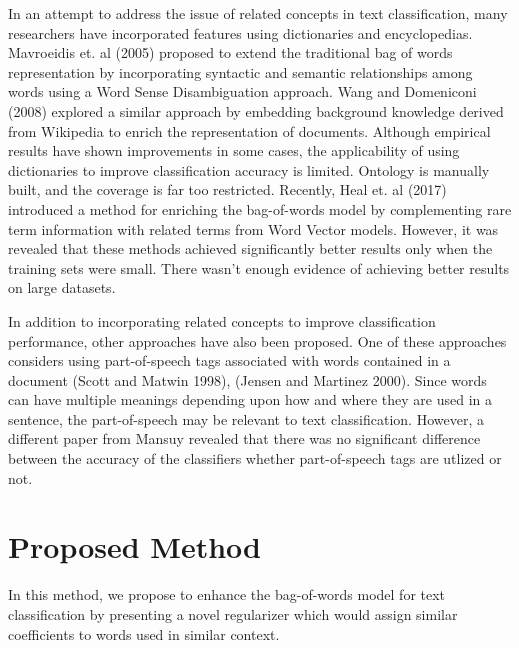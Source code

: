In an attempt to address the issue of related concepts in text classification, many researchers have incorporated features using dictionaries and encyclopedias. Mavroeidis et. al \cite{mavroeidis2005word} (2005) proposed to extend the traditional bag of words representation by incorporating syntactic and semantic relationships among words using a Word Sense Disambiguation approach. Wang and Domeniconi \cite{wang2008building} (2008) explored a similar approach by embedding background knowledge derived from Wikipedia to enrich the representation of documents. Although empirical results have shown improvements in some cases, the applicability of using dictionaries to improve classification accuracy is limited. Ontology is manually built, and the coverage is far too restricted. Recently, Heal et. al \cite{heap2017word} (2017) introduced a method for enriching the bag-of-words model by complementing rare term information with related terms from Word Vector models. However, it was revealed that these methods achieved significantly better results only when the training sets were small. There wasn't enough evidence of achieving better results on large datasets.

In addition to incorporating related concepts to improve classification performance, other approaches have also been proposed. One of these approaches considers using part-of-speech tags associated with words contained in a document (Scott and Matwin \cite{scott1998text} 1998), (Jensen and Martinez \cite{jensen2000improving} 2000). Since words can have multiple meanings depending upon how and where they are used in a sentence, the part-of-speech may be relevant to text classification. However, a different paper from Mansuy \cite{mansuy2006characterization} revealed that there was no significant difference between the accuracy of the classifiers whether part-of-speech tags are utlized or not.

\chapter{Proposed Method}

In this method, we propose to enhance the bag-of-words model for text classification by presenting a novel regularizer which would assign similar coefficients to words used in similar context.

